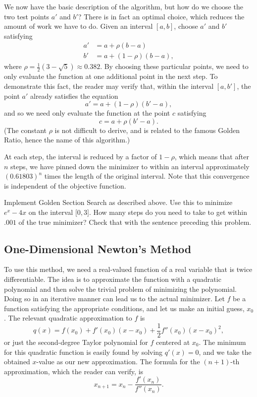 We now have the basic description of the algorithm, but how do we choose the two test
points $a'$ and $b'$? There is in fact an optimal choice, which reduces the amount of
work we have to do. Given an interval $[a, b]$, choose $a'$ and $b'$ satisfying
\begin{align*}
a' &= a + \rho(b - a) \\
b' &= a + (1 - \rho)(b - a),
\end{align*}
where $\rho = \frac{1}{2}(3 - \sqrt{5}) \approx 0.382$. By choosing these particular
points, we need to only evaluate the function at one additional point in the next step.
To demonstrate this fact, the reader may verify that, within the interval $[a, b']$,
the point $a'$ already satisfies the equation
\begin{equation*}
a' = a + (1 - \rho)(b' - a),
\end{equation*}
and so we need only evaluate the function at the point $c$ satisfying
\begin{equation*}
c = a + \rho(b' - a).
\end{equation*}
(The constant $\rho$ is not difficult to derive, and is related to the famous Golden Ratio, hence the name of this algorithm.)

At each step, the interval is reduced by a factor of $1-\rho$, which means that after
$n$ steps, we have pinned down the minimizer to within an interval approximately
$(0.61803)^n$ times the length of the original interval. Note that this convergence is
independent of the objective function.

\begin{problem}
Implement Golden Section Search as described above. Use this to minimize $e^x - 4x$
on the interval $\lbrack 0, 3 \rbrack$. How many steps do you need to take to get
within $.001$ of the true minimizer? Check that with the sentence preceding this
problem.
\end{problem}

\subsection*{One-Dimensional Newton's Method}
To use this method, we need a real-valued function of a real variable that is twice
differentiable. The idea is to approximate the function with a quadratic polynomial and
then solve the trivial problem of minimizing the polynomial. Doing so in an iterative
manner can lead us to the actual minimizer. Let $f$ be a function satisfying the
appropriate conditions, and let us make an initial guess, $x_0$. The relevant quadratic
approximation to $f$ is
\begin{equation*}
q(x) = f(x_0) + f'(x_0)(x-x_0) + \frac{1}{2}f''(x_0)(x-x_0)^2,
\end{equation*}
or just the second-degree Taylor polynomial for $f$ centered at $x_0$. The minimum
for this quadratic function is easily found by solving $q'(x) = 0$, and we take the
obtained $x$-value as our new approximation. The formula for the $(n+1)$-th
approximation, which the reader can verify, is
\begin{equation*}
x_{n+1} = x_n - \frac{f'(x_n)}{f''(x_n)}.
\end{equation*}

